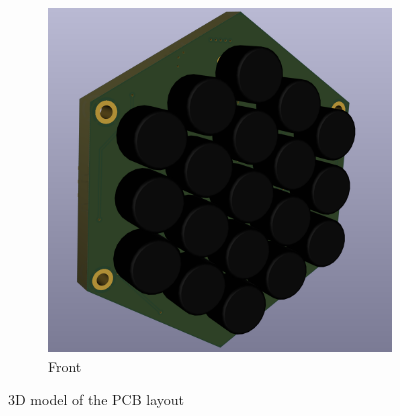 \begin{figure}[ht]
\begin{subfigure}[b]{0.49\textwidth}
    \includegraphics[width=\textwidth]{src/assets/pictures/circuit/pcb_front.png}
    \caption{Front}
    \label{fig:pcb:front}
  \end{subfigure}
  \caption{3D model of the PCB layout}
  \label{fig:pcb}
\end{figure}
%